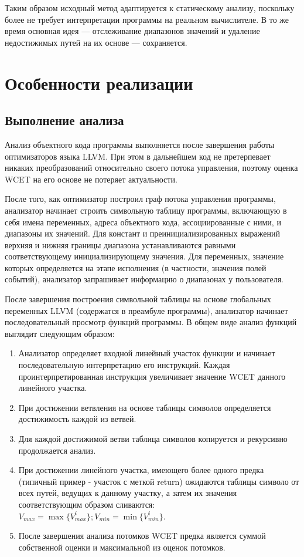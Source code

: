 \documentclass[12pt,a4paper]{article}
\begin{document}
Таким образом исходный метод адаптируется к статическому анализу, поскольку более не требует интерпретации программы на реальном вычислителе. В то же время основная идея --- отслеживание диапазонов значений и удаление недостижимых путей на их основе --- сохраняется.

\newpage
\section{Особенности реализации}

\subsection{Выполнение анализа}

Анализ объектного кода программы выполняется после завершения работы оптимизаторов языка LLVM. При этом в дальнейшем код не претерпевает никаких преобразований относительно своего потока управления, поэтому оценка WCET на его основе не потеряет актуальности.

После того, как оптимизатор построил граф потока управления программы, анализатор начинает строить символьную таблицу программы, включающую в себя имена переменных, адреса объектного кода, ассоциированные с ними, и диапазоны их значений. Для констант и преинициализированных выражений верхняя и нижняя границы диапазона устанавливаются равными соответствующему инициализирующему значения. Для переменных, значение которых определяется на этапе исполнения (в частности, значения полей событий), анализатор запрашивает информацию о диапазонах у пользователя.

После завершения построения символьной таблицы на основе глобальных переменных LLVM (содержатся в преамбуле программы), анализатор начинает последовательный просмотр функций программы. В общем виде анализ функций выглядит следующим образом: 

\begin{enumerate}
\item Анализатор определяет входной линейный участок функции и начинает последовательную интерпретацию его инструкций. Каждая проинтерпретированная инструкция увеличивает значение WCET данного линейного участка.
\item При достижении ветвления на основе таблицы символов определяется достижимость каждой из ветвей.
\item Для каждой достижимой ветви таблица символов копируется и рекурсивно продолжается анализ.
\item При достижении линейного участка, имеющего более одного предка (типичный пример - участок с меткой return) ожидаются таблицы символо от всех путей, ведущих к данному участку, а затем их значения соответствующим образом сливаются: $V_{max}=\max\{V^i_{max}\};V_{min}=\min\{V^i_{min}\}$.
\item После завершения анализа потомков WCET предка является суммой собственной оценки и максимальной из оценок потомков.
\end{enumerate}
\end{document}
